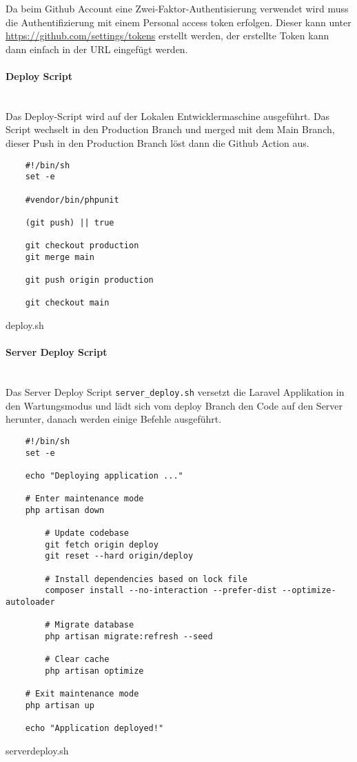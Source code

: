 Da beim Github Account eine Zwei-Faktor-Authentisierung verwendet wird muss die
Authentifizierung mit einem Personal access token erfolgen. Dieser kann unter
\url{https://github.com/settings/tokens} erstellt werden, der erstellte Token
kann dann einfach in der URL eingefügt werden.

\paragraph{Deploy Script}\mbox{}\\

Das Deploy-Script wird auf der Lokalen Entwicklermaschine ausgeführt. Das Script
wechselt in den Production Branch und merged mit dem Main Branch, dieser Push in
den Production Branch löst dann die Github Action aus.

\begin{listing}[H]
  \begin{verbatim}
    #!/bin/sh
    set -e
    
    #vendor/bin/phpunit
    
    (git push) || true
    
    git checkout production
    git merge main
    
    git push origin production
    
    git checkout main
  \end{verbatim}
  \caption{deploy.sh}
\end{listing}

\paragraph{Server Deploy Script}\mbox{}\\

Das Server Deploy Script \verb|server_deploy.sh| versetzt die Laravel
Applikation in den Wartungsmodus und lädt sich vom deploy Branch den Code auf
den Server herunter, danach werden einige Befehle ausgeführt.

\begin{longlisting}
  \begin{verbatim}
    #!/bin/sh
    set -e
    
    echo "Deploying application ..."
    
    # Enter maintenance mode
    php artisan down
        
        # Update codebase
        git fetch origin deploy
        git reset --hard origin/deploy
    
        # Install dependencies based on lock file
        composer install --no-interaction --prefer-dist --optimize-autoloader
    
        # Migrate database
        php artisan migrate:refresh --seed
    
        # Clear cache
        php artisan optimize
    
    # Exit maintenance mode
    php artisan up
    
    echo "Application deployed!"
  \end{verbatim}
  \caption{serverdeploy.sh}
\end{longlisting}



